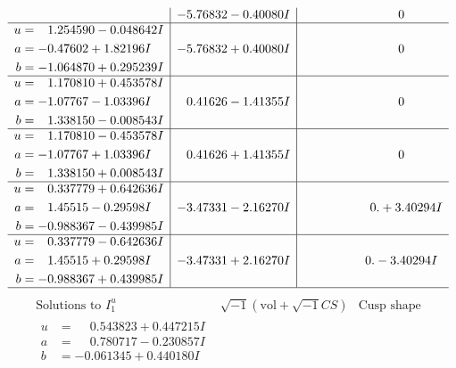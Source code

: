 \documentclass[1p]{elsarticle_modified}
\theoremstyle{definition}
\newcommand{\I}{\sqrt{-1}}
\begin{document}
$$\begin{array}{c|c|c}
 & -5.76832 - 0.40080 I & \phantom{-0.000000 } 0 \\ \hline\begin{aligned}
u &= \phantom{-}1.254590 - 0.048642 I \\
a &= -0.47602 + 1.82196 I \\
b &= -1.064870 + 0.295239 I\end{aligned}
 & -5.76832 + 0.40080 I & \phantom{-0.000000 } 0 \\ \hline\begin{aligned}
u &= \phantom{-}1.170810 + 0.453578 I \\
a &= -1.07767 - 1.03396 I \\
b &= \phantom{-}1.338150 - 0.008543 I\end{aligned}
 & \phantom{-}0.41626 - 1.41355 I & \phantom{-0.000000 } 0 \\ \hline\begin{aligned}
u &= \phantom{-}1.170810 - 0.453578 I \\
a &= -1.07767 + 1.03396 I \\
b &= \phantom{-}1.338150 + 0.008543 I\end{aligned}
 & \phantom{-}0.41626 + 1.41355 I & \phantom{-0.000000 } 0 \\ \hline\begin{aligned}
u &= \phantom{-}0.337779 + 0.642636 I \\
a &= \phantom{-}1.45515 - 0.29598 I \\
b &= -0.988367 - 0.439985 I\end{aligned}
 & -3.47331 - 2.16270 I & \phantom{-0.000000 -}0. + 3.40294 I \\ \hline\begin{aligned}
u &= \phantom{-}0.337779 - 0.642636 I \\
a &= \phantom{-}1.45515 + 0.29598 I \\
b &= -0.988367 + 0.439985 I\end{aligned}
 & -3.47331 + 2.16270 I & \phantom{-0.000000 } 0. - 3.40294 I\\
 \hline 
 \end{array}$$\newpage$$\begin{array}{c|c|c}  
\text{Solutions to }I^u_{1}& \I (\text{vol} + \sqrt{-1}CS) & \text{Cusp shape}\\
 \hline 
\begin{aligned}
u &= \phantom{-}0.543823 + 0.447215 I \\
a &= \phantom{-}0.780717 - 0.230857 I \\
b &= -0.061345 + 0.440180 I\end{aligned}

\end{array}$$
\end{document}

